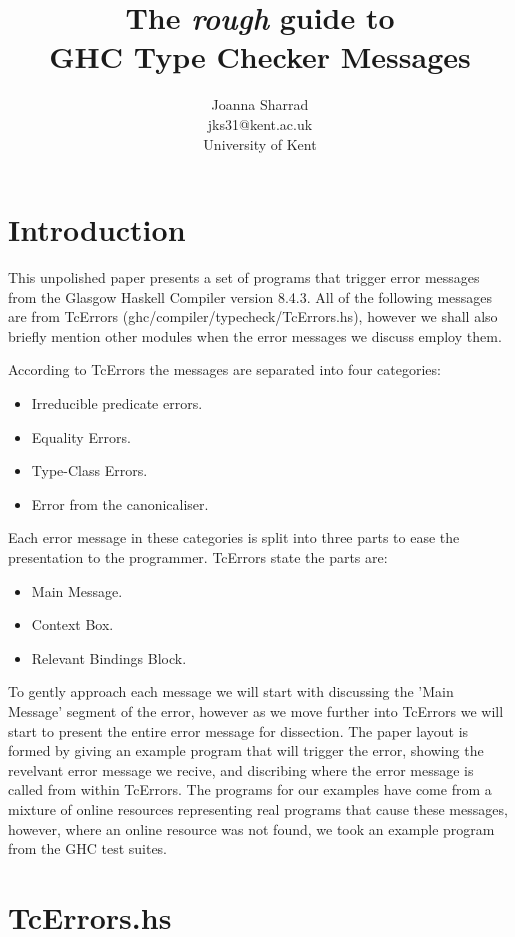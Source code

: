 \documentclass[a4paper]{article}
\title{The \textit{\textbf{rough}} guide to \\GHC Type Checker Messages}
\author{Joanna Sharrad \\ \small jks31@kent.ac.uk \\ \small University of Kent}
\date{}
\begin{document}
\maketitle

\section{Introduction}

This unpolished paper presents a set of programs that trigger error messages from the Glasgow Haskell Compiler version 8.4.3. All of the following messages are from TcErrors (ghc/compiler/typecheck/TcErrors.hs), however we shall also briefly mention other modules when the error messages we discuss employ them. 

According to TcErrors the messages are separated into four categories:

\begin{itemize}
\item Irreducible predicate errors.
\item Equality Errors.
\item Type-Class Errors.
\item Error from the canonicaliser.
\end{itemize}

Each error message in these categories is split into three parts to ease the presentation to the programmer. TcErrors state the parts are:

\begin{itemize}
\item Main Message.
\item Context Box.
\item Relevant Bindings Block.
\end{itemize}

To gently approach each message we will start with discussing the 'Main Message' segment of the error, however as we move further into TcErrors we will start to present the entire error message for dissection. The paper layout is formed by giving an example program that will trigger the error, showing the revelvant error message we recive, and discribing where the error message is called from within TcErrors. The programs for our examples have come from a mixture of online resources representing real programs that cause these messages, however, where an online resource was not found, we took an example program from the GHC test suites. 

\section{TcErrors.hs}
\end{document}
